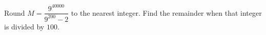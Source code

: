 Round $M=\dfrac{9^{40000}}{9^{200}-2}$ to the nearest integer. Find the remainder when that integer is divided by $100$.
